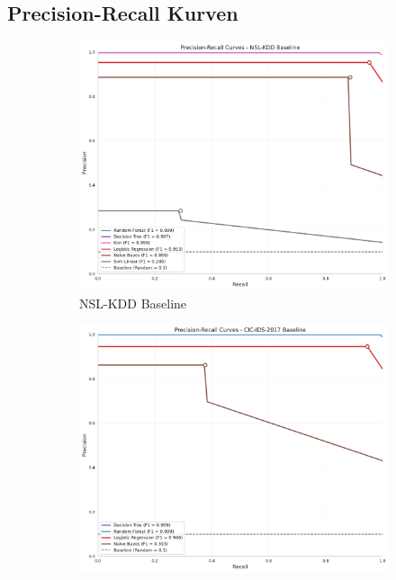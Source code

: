 \documentclass[11pt,a4paper]{article}
\begin{document}
    \subsection{Precision-Recall Kurven}
    \label{app:pr_curves}

    \begin{figure}[H]
        \centering
        \begin{subfigure}[b]{0.48\textwidth}
            \includegraphics[width=\textwidth]{../data/results/precision_recall_curves/nsl_kdd_baseline_scientific_pr.pdf}
            \caption{NSL-KDD Baseline}
        \end{subfigure}
        \hfill
        \begin{subfigure}[b]{0.48\textwidth}
            \includegraphics[width=\textwidth]{../data/results/precision_recall_curves/cic_ids_2017_baseline_scientific_pr.pdf}

\end{subfigure}
\end{figure}
\end{document}
